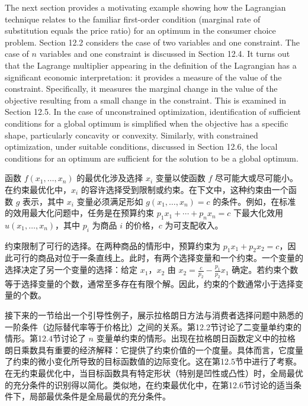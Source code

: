 \begin{original}
The next section provides a motivating example showing how the Lagrangian technique relates to the familiar first-order condition (marginal rate of substitution equals the price ratio) for an optimum in the consumer choice problem. Section 12.2 considers the case of two variables and one constraint. The case of $n$ variables and one constraint is discussed in Section 12.4. It turns out that the Lagrange multiplier appearing in the definition of the Lagrangian has a significant economic interpretation: it provides a measure of the value of the constraint. Specifically, it measures the marginal change in the value of the objective resulting from a small change in the constraint. This is examined in Section 12.5. In the case of unconstrained optimization, identification of sufficient conditions for a global optimum is simplified when the objective has a specific shape, particularly concavity or convexity. Similarly, with constrained optimization, under suitable conditions, discussed in Section 12.6, the local conditions for an optimum are sufficient for the solution to be a global optimum.
\end{original}
\begin{translation}
函数 $f(x_1,\ldots,x_n)$ 的最优化涉及选择 $x_i$ 变量以使函数 $f$ 尽可能大或尽可能小。在约束最优化中，$x_i$ 的容许选择受到限制或约束。在下文中，这种约束由一个函数 $g$ 表示，其中 $x_i$ 变量必须满足形如 $g(x_1,\ldots,x_n) = c$ 的条件。例如，在标准的效用最大化问题中，任务是在预算约束 $p_1x_1 + \cdots + p_nx_n = c$ 下最大化效用 $u(x_1,\ldots,x_n)$，其中 $p_i$ 为商品 $i$ 的价格，$c$ 为可支配收入。

约束限制了可行的选择。在两种商品的情形中，预算约束为 $p_1x_1 + p_2x_2 = c$，因此可行的商品对位于一条直线上。此时，有两个选择变量和一个约束。一个变量的选择决定了另一个变量的选择：给定 $x_1$，$x_2$ 由 $x_2 = \frac{c}{p_2} - \frac{p_1}{p_2}x_1$ 确定。若约束个数等于选择变量的个数，通常至多存在有限个解。因此，约束的个数通常小于选择变量的个数。

接下来的一节给出一个引导性例子，展示拉格朗日方法与消费者选择问题中熟悉的一阶条件（边际替代率等于价格比）之间的关系。第12.2节讨论了二变量单约束的情形。第12.4节讨论了 $n$ 变量单约束的情形。出现在拉格朗日函数定义中的拉格朗日乘数具有重要的经济解释：它提供了约束价值的一个度量。具体而言，它度量了约束的微小变化所导致的目标函数值的边际变化。这在第12.5节中进行了考察。在无约束最优化中，当目标函数具有特定形状（特别是凹性或凸性）时，全局最优的充分条件的识别得以简化。类似地，在约束最优化中，在第12.6节讨论的适当条件下，局部最优条件是全局最优的充分条件。
\end{translation}

